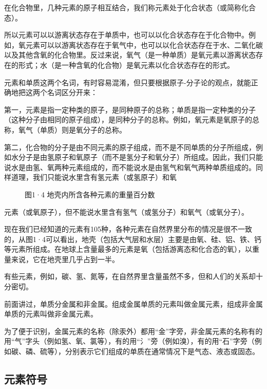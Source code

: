 在化合物里，几种元素的原子相互结合，我们称元素处于化合状态（或简称化合态）。

所以元素可以以游离状态存在于单质中，也可以以化合状态存在于化合物中。例如，氧元素可以以游离状态存在于氧气中，也可以以化合状态存在于水、二氧化碳以及其他含氧的化合物里。反过来说，氧气（是一种单质）是氧元素以游离状态存在的形式；水（是一种含氧的化合物）是氧元素以化合状态存在的形式。

元素和单质这两个名词，有时容易混淆，但只要根据原子-分子论的观点，就能正确地把这两个名词区分开来：

第一，元素是指一定种类的原子，是同种原子的总称；单质是指一定种类的分子（这种分子由相同的原子组成），是同种分子的总称。例如，氧元素是氧原子的总称，氧气（单质）则是氧分子的总称。

第二，化合物的分子是由不同元素的原子组成，而不是不同单质的分子所组成，例如水分子是由氢原子和氧原子（而不是氢分子和氧分子）所组成。因此，我们只能说水是由氢、氧两种元素组成的，而不能说水是由氢气和氧气两种单质组成的。同样道理，我们只能说水里含有氢元素（或氢原子）和氧

\begin{figure}
\centering
\caption{图1·4 地壳内所含各种元素的重量百分数}
\end{figure}

元素（或氧原子），但不能说水里含有氢气（或氢分子）和氧气（或氧分子）。

现在我们已经知道的元素有105种，各种元素在自然界里分布的情况是很不一致的，从图1·4可以看出，地壳（包括大气层和水层）主要是由氧、硅、铝、铁、钙等元素所组成。在地球上含量最多的元素是氧（包括游离态和化合态的氧），以重量来说，它在地壳里几乎占到一半。

有些元素，例如，碳、氢、氮等，在自然界里含量虽然不多，但和人们的关系却十分密切。

前面讲过，单质分金属和非金属。组成金属单质的元素叫做金属元素，组成非金属单质的元素叫做非金属元素。

为了便于识别，金属元素的名称（除汞外）都用``金''字旁，非金属元素的名称有的用``气''字头（例如氢、氧、氯等），有的用``氵''旁（例如溴），有的用``石''字旁（例如碳、磷、硫等），分别表示它们组成的单质在通常情况下是气态、液态或固态。

\subsection{元素符号}

